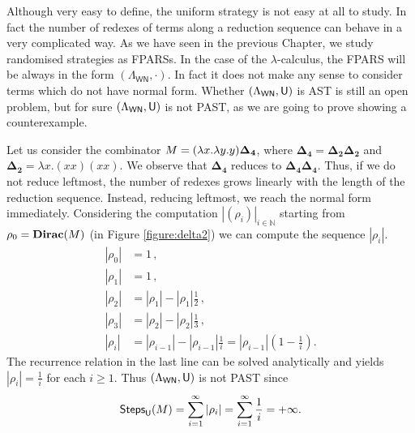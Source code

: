 Although very easy to define, the uniform strategy is not easy at all to study. In fact the number of redexes of terms along a reduction sequence can behave in a very complicated way. As we have seen in the previous Chapter, we study randomised strategies as FPARSs. In the case of the $\lambda$-calculus, the FPARS will be always in the form $(\Lambda_\mathsf{WN},\cdot)$. In fact it does not make any sense to consider terms which do not have normal form. Whether $(\Lambda_\mathsf{WN},\mathsf{U})$ is AST is still an open problem, but for sure $(\Lambda_\mathsf{WN},\mathsf{U})$ is not PAST, as we are going to prove showing a counterexample. 
\begin{example}
	Let us  consider the combinator $M=(\lambda x.\lambda y.y)\bm{\Delta_4}$, where $\bm{\Delta_4}=\bm{\Delta_2\Delta_2}$ and $\bm{\Delta_2}= \lambda x.(xx)(xx)$. We observe that $\bm{\Delta_4}$ reduces to $\bm{\Delta_4\Delta_4}$. Thus, if we do not reduce leftmost, the number of redexes grows linearly with the length of the reduction sequence. Instead, reducing leftmost, we reach the normal form immediately. Considering the computation $|(\rho_i)|_{i\in\mathbb{N}}$ starting from $\rho_0=\textbf{Dirac}(M)$ (in Figure \ref{figure:delta2}) we can compute the sequence $|\rho_i|$.
	\begin{equation*}
	\begin{split}
	|\rho_0|&=1\,,\\
	|\rho_1|&=1\,,\\
	|\rho_2|&=|\rho_1|-|\rho_1|\frac{1}{2}\,,\\
	|\rho_3|&=|\rho_2|-|\rho_2|\frac{1}{3}\,,\\
	|\rho_i|&=|\rho_{i-1}|-|\rho_{i-1}|\frac{1}{i}=|\rho_{i-1}|\left( 1-\frac{1}{i}\right).
	\end{split}
	\end{equation*}
	The recurrence relation in the last line can be solved analytically and yields $|\rho_i|=\frac{1}{i}$ for each $i\geq 1$. Thus $(\Lambda_\mathsf{WN},\mathsf{U})$ is not PAST since 
	$$
	\textsf{Steps}_{\mathsf{U}}(M)=\sum\limits_{i=1}^{\infty} \left|\rho_i\right|=\sum\limits_{i=1}^{\infty} \frac{1}{i}=+\infty.
	$$
\end{example}

